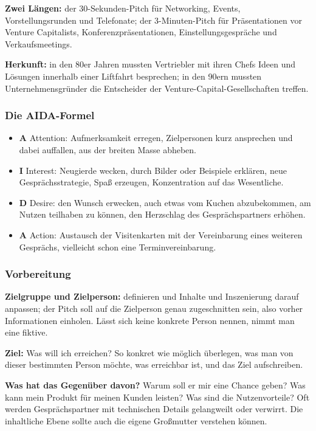 \documentclass[12pt, a4paper]{article}
\begin{document}
\textbf{Zwei Längen:} der 30-Sekunden-Pitch für Networking, Events,
Vorstellungsrunden und Telefonate; der 3-Minuten-Pitch für Präsentationen vor
Venture Capitalists, Konferenzpräsentationen, Einstellungsgespräche und
Verkaufsmeetings.

\textbf{Herkunft:} in den 80er Jahren mussten Vertriebler mit ihren Chefs
Ideen und Lösungen innerhalb einer Liftfahrt besprechen; in den 90ern mussten
Unternehmensgründer die Entscheider der Venture-Capital-Gesellschaften
treffen.

\subsubsection{Die AIDA-Formel}

\begin{itemize}
  \item \textbf{A} Attention: Aufmerksamkeit erregen, Zielpersonen kurz
        ansprechen und dabei auffallen, aus der breiten Masse abheben.
  \item \textbf{I} Interest: Neugierde wecken, durch Bilder oder Beispiele
        erklären, neue Gesprächsstrategie, Spaß erzeugen, Konzentration auf
        das Wesentliche.
  \item \textbf{D} Desire: den Wunsch erwecken, auch etwas vom Kuchen
        abzubekommen, am Nutzen teilhaben zu können, den Herzschlag des
        Gesprächspartners erhöhen.
  \item \textbf{A} Action: Austausch der Visitenkarten mit der Vereinbarung
        eines weiteren Gesprächs, vielleicht schon eine Terminvereinbarung.
\end{itemize}

\subsubsection{Vorbereitung}

\textbf{Zielgruppe und Zielperson:} definieren und Inhalte und Inszenierung
darauf anpassen; der Pitch soll auf die Zielperson genau zugeschnitten sein,
also vorher Informationen einholen. Lässt sich keine konkrete Person nennen,
nimmt man eine fiktive.

\textbf{Ziel:} \glqq Was will ich erreichen?\grqq{} So konkret wie möglich
überlegen, was man von dieser bestimmten Person möchte, was erreichbar ist,
und das Ziel aufschreiben.

\textbf{Was hat das Gegenüber davon?} Warum soll er mir eine Chance geben?
Was kann mein Produkt für meinen Kunden leisten? Was sind die Nutzenvorteile?
Oft werden Gesprächspartner mit technischen Details gelangweilt oder
verwirrt. Die inhaltliche Ebene sollte auch die eigene Großmutter verstehen
können.
\end{document}
